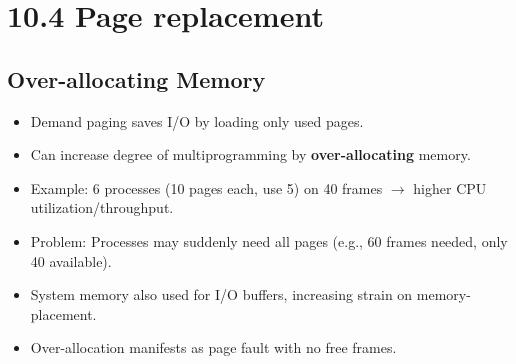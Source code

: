 \section{10.4 Page replacement}

\subsection{Over-allocating Memory}
\begin{itemize}
    \item Demand paging saves I/O by loading only used pages.
    \item Can increase degree of multiprogramming by \textbf{over-allocating} memory.
    \item Example: 6 processes (10 pages each, use 5) on 40 frames $\rightarrow$ higher CPU utilization/throughput.
    \item Problem: Processes may suddenly need all pages (e.g., 60 frames needed, only 40 available).
    \item System memory also used for I/O buffers, increasing strain on memory-placement.
    \item Over-allocation manifests as page fault with no free frames.
\end{itemize}

